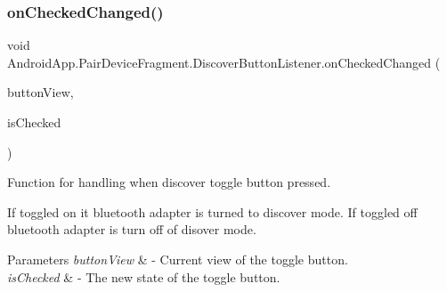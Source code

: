 \subsubsection{\texorpdfstring{on\+Checked\+Changed()}{onCheckedChanged()}}
{\footnotesize\ttfamily void Android\+App.\+Pair\+Device\+Fragment.\+Discover\+Button\+Listener.\+on\+Checked\+Changed (\begin{DoxyParamCaption}\item[{Compound\+Button}]{button\+View,  }\item[{boolean}]{is\+Checked }\end{DoxyParamCaption})\hspace{0.3cm}{\ttfamily [inline]}}



Function for handling when discover toggle button pressed. 

If toggled on it bluetooth adapter is turned to discover mode. If toggled off bluetooth adapter is turn off of disover mode.


\begin{DoxyParams}{Parameters}
{\em button\+View} & -\/ Current view of the toggle button. \\
\hline
{\em is\+Checked} & -\/ The new state of the toggle button. \\
\hline
\end{DoxyParams}

